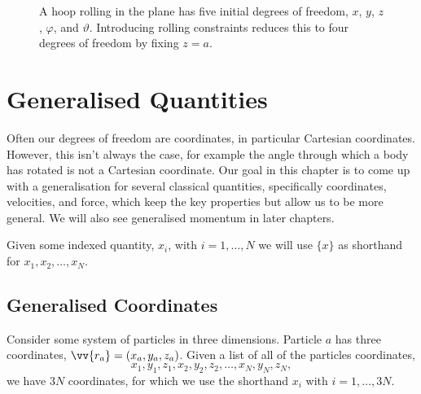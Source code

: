 \documentclass[fleqn]{NotesClass}
\begin{document}
    \begin{figure}
        \caption{A hoop rolling in the plane has five initial degrees of freedom, \(x\), \(y\), \(z\), \(\varphi\), and \(\vartheta\). Introducing rolling constraints reduces this to four degrees of freedom by fixing \(z = a\).}
    \end{figure}
    
    \chapter{Generalised Quantities}
    Often our degrees of freedom are coordinates, in particular Cartesian coordinates.
    However, this isn't always the case, for example the angle through which a body has rotated is not a Cartesian coordinate.
    Our goal in this chapter is to come up with a generalisation for several classical quantities, specifically coordinates, velocities, and force, which keep the key properties but allow us to be more general.
    We will also see generalised momentum in later chapters.
    
    \begin{ntn}{}{}
        Given some indexed quantity, \(x_i\), with \(i = 1, \dotsc, N\) we will use \(\{x\}\) as shorthand for \(x_1, x_2, \dotsc, x_N\).
    \end{ntn}

    \section{Generalised Coordinates}
    Consider some system of particles in three dimensions.
    Particle \(a\) has three coordinates, \(\vv{r_a} = (x_a, y_a, z_a)\).
    Given a list of all of the particles coordinates,
    \begin{equation}
        x_1, y_1, z_1, x_2, y_2, z_2, \dotsc, x_N, y_N, z_N,
    \end{equation}
    we have \(3N\) coordinates, for which we use the shorthand \(x_i\) with \(i = 1, \dotsc, 3N\).
    
\end{document}
